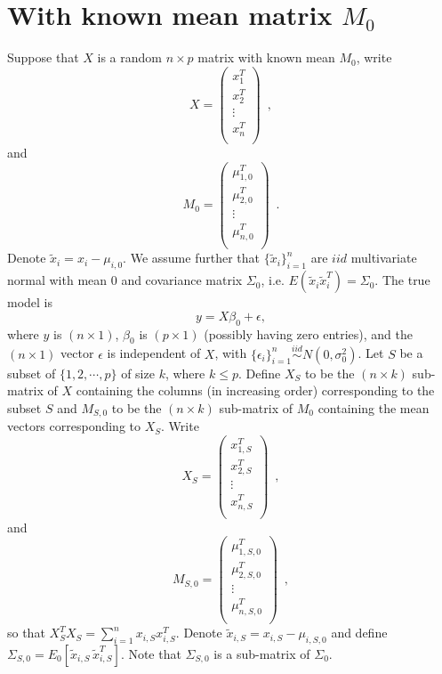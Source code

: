 \documentclass[11pt]{article}
\begin{document}
{\section{With known mean matrix $M_0$}
Suppose that $X$ is a random $n \times p$ matrix with known mean $M_0$, write
\[
X=
\left(
    \begin{array}{c}
      x_1^T \\
      x_2^T \\
      \vdots \\
      x_n^T \\
    \end{array}
  \right) \,\,\, ,
\]
and
\[
M_0=
\left(
    \begin{array}{c}
      \mu_{1,0}^T \\
      \mu_{2,0}^T \\
      \vdots \\
      \mu_{n,0}^T \\
    \end{array}
  \right) \,\,\, .
\]
Denote $\tilde{x}_i = x_i - \mu_{i,0}$. We assume further that $\{\tilde{x}_i\}_{i=1}^n$ are $iid$ multivariate normal with mean $0$ and covariance matrix $\Sigma_0$, i.e. $E(\tilde{x}_i \tilde{x}_i^T) = \Sigma_0$.
The true model is
\begin{equation}
y=X \beta_0 + \epsilon ,
\label{eq:truemodel}
\end{equation}
where $y$ is $(n \times 1)$, $\beta_0$ is $(p \times 1)$ (possibly having zero entries), and the $(n \times 1)$ vector $\epsilon$ is independent of $X$, with $\{\epsilon_i\}_{i=1}^n \stackrel {iid} {\sim} N(0,\sigma_0^2)$.
Let $S$ be a subset of $\{1,2,\cdots,p\}$ of size $k$, where $k \leq p$. Define $X_S$ to be the $(n \times k)$ sub-matrix of $X$ containing the columns (in increasing order) corresponding to the subset $S$ and $M_{S,0}$ to be the $(n \times k)$ sub-matrix of $M_0$ containing the mean vectors corresponding to $X_S$. Write
\[
X_S=
\left(
    \begin{array}{c}
      x_{1,S}^T \\
      x_{2,S}^T \\
      \vdots \\
      x_{n,S}^T \\
    \end{array}
  \right) \,\,\, ,
\]
and 
\[
M_{S,0}=
\left(
    \begin{array}{c}
      \mu_{1,S,0}^T \\
      \mu_{2,S,0}^T \\
      \vdots \\
      \mu_{n,S,0}^T \\
    \end{array}
  \right) \,\,\, ,
\]
so that $X_S^T X_S = \sum_{i=1}^n x_{i,S} x_{i,S}^T$. Denote $\tilde{x}_{i,S} = x_{i,S} - \mu_{i,S,0}$ and define $\Sigma_{S,0} = E_0[\tilde{x}_{i,S} \, \tilde{x}_{i,S}^T]$. Note that $\Sigma_{S,0}$ is a sub-matrix of $\Sigma_0$.

}
\end{document}
